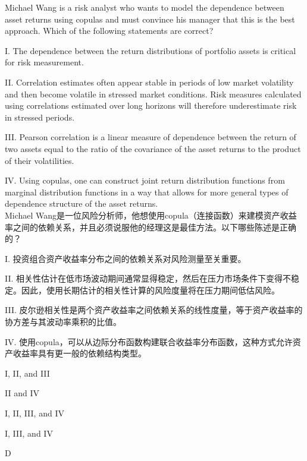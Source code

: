 \documentclass{article}
\newcounter{question} %
\begin{document}
\begin{question}
    Michael Wang is a risk analyst who wants to model the dependence between asset returns using copulas and must convince his manager that this is the best approach. Which of the following statements are correct?

    I. The dependence between the return distributions of portfolio assets is critical for risk measurement.

    II. Correlation estimates often appear stable in periods of low market volatility and then become volatile in stressed market conditions. Risk measures calculated using correlations estimated over long horizons will therefore underestimate risk in stressed periods.

    III. Pearson correlation is a linear measure of dependence between the return of two assets equal to the ratio of the covariance of the asset returns to the product of their volatilities.

    IV. Using copulas, one can construct joint return distribution functions from marginal distribution functions in a way that allows for more general types of dependence structure of the asset returns.
   \\    Michael Wang是一位风险分析师，他想使用copula（连接函数）来建模资产收益率之间的依赖关系，并且必须说服他的经理这是最佳方法。以下哪些陈述是正确的？

   I. 投资组合资产收益率分布之间的依赖关系对风险测量至关重要。

   II. 相关性估计在低市场波动期间通常显得稳定，然后在压力市场条件下变得不稳定。因此，使用长期估计的相关性计算的风险度量将在压力期间低估风险。

   III. 皮尔逊相关性是两个资产收益率之间依赖关系的线性度量，等于资产收益率的协方差与其波动率乘积的比值。

   IV. 使用copula，可以从边际分布函数构建联合收益率分布函数，这种方式允许资产收益率具有更一般的依赖结构类型。 
\end{question}

\begin{choices}
    \item I, II, and III
    \item II and IV
    \item I, II, III, and IV
    \item I, III, and IV
\end{choices}

\begin{correctanswer}
    D
\end{correctanswer}
\end{document}
